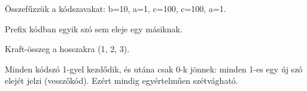 Összefűzzük a kódszavakat: b=10, a=1, c=100, c=100, a=1.

\begin{center}\end{center}

Prefix kódban egyik szó sem eleje egy másiknak.

\begin{center}\end{center}

Kraft-összeg a hosszakra (1, 2, 3).

\begin{center}\end{center}

Minden kódszó 1-gyel kezdődik, és utána csak 0-k jönnek: minden 1-es egy új szó elejét jelzi (vesszőkód). Ezért mindig egyértelműen szétvágható.

\begin{center}\end{center}
\begin{eredmeny}

\begin{center}\end{center}
\end{eredmeny}


